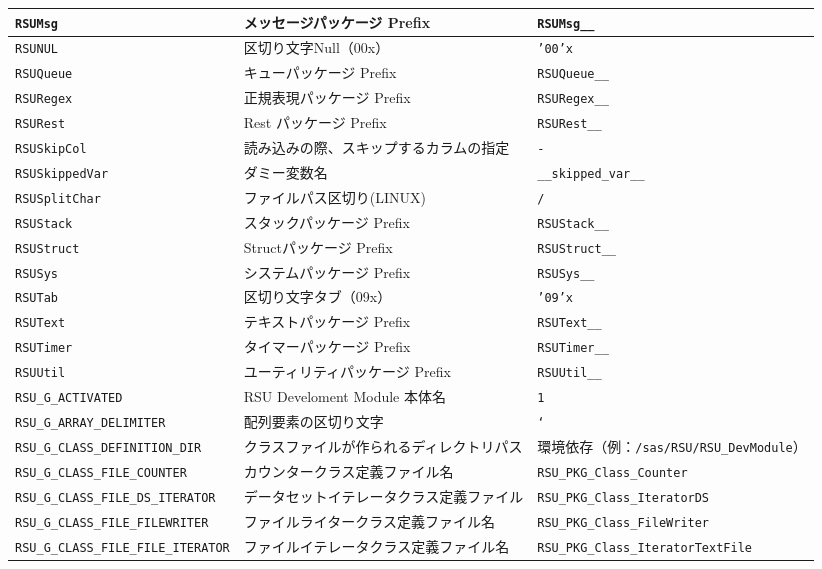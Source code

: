 \begin{center}
{\begin{xltabular}{\textwidth}{|p{5truecm}|X|p{5truecm}|}
\hline
\texttt{RSUMsg}&メッセージパッケージ Prefix&\texttt{RSUMsg\_\_}\\
\hline
\texttt{RSUNUL}&区切り文字Null（00x）&\texttt{'00'x}\\
\hline
\texttt{RSUQueue}&キューパッケージ Prefix&\texttt{RSUQueue\_\_}\\
\hline
\texttt{RSURegex}&正規表現パッケージ Prefix&\texttt{RSURegex\_\_}\\
\hline
\texttt{RSURest}&Rest パッケージ Prefix&\texttt{RSURest\_\_}\\
\hline
\texttt{RSUSkipCol}&読み込みの際、スキップするカラムの指定&\texttt{-}\\
\hline
\texttt{RSUSkippedVar}&ダミー変数名&\texttt{\_\_skipped\_var\_\_}\\
\hline
\texttt{RSUSplitChar}&ファイルパス区切り(LINUX)&\texttt{/}\\
\hline
\texttt{RSUStack}&スタックパッケージ Prefix&\texttt{RSUStack\_\_}\\
\hline
\texttt{RSUStruct}&Structパッケージ Prefix&\texttt{RSUStruct\_\_}\\
\hline
\texttt{RSUSys}&システムパッケージ Prefix&\texttt{RSUSys\_\_}\\
\hline
\texttt{RSUTab}&区切り文字タブ（09x）&\texttt{'09'x}\\
\hline
\texttt{RSUText}&テキストパッケージ Prefix&\texttt{RSUText\_\_}\\
\hline
\texttt{RSUTimer}&タイマーパッケージ Prefix&\texttt{RSUTimer\_\_}\\
\hline
\texttt{RSUUtil}&ユーティリティパッケージ Prefix&\texttt{RSUUtil\_\_}\\
\hline
\texttt{RSU\_G\_ACTIVATED}&RSU Develoment Module 本体名&\texttt{1}\\
\hline
\texttt{RSU\_G\_ARRAY\_DELIMITER}&配列要素の区切り文字&\texttt{`}\\
\hline
\texttt{RSU\_G\_CLASS\_DEFINITION\_DIR}&クラスファイルが作られるディレクトリパス&環境依存（例：\texttt{/sas/RSU/RSU\_DevModule}）\\
\hline
\texttt{RSU\_G\_CLASS\_FILE\_COUNTER}&カウンタークラス定義ファイル名&\texttt{RSU\_PKG\_Class\_Counter}\\
\hline
\texttt{RSU\_G\_CLASS\_FILE\_DS\_ITERATOR}&データセットイテレータクラス定義ファイル&\texttt{RSU\_PKG\_Class\_IteratorDS}\\
\hline
\texttt{RSU\_G\_CLASS\_FILE\_FILEWRITER}&ファイルライタークラス定義ファイル名&\texttt{RSU\_PKG\_Class\_FileWriter}\\
\hline
\texttt{RSU\_G\_CLASS\_FILE\_FILE\_ITERATOR}&ファイルイテレータクラス定義ファイル名&\texttt{RSU\_PKG\_Class\_IteratorTextFile}\\

\end{xltabular}}
\end{center}
